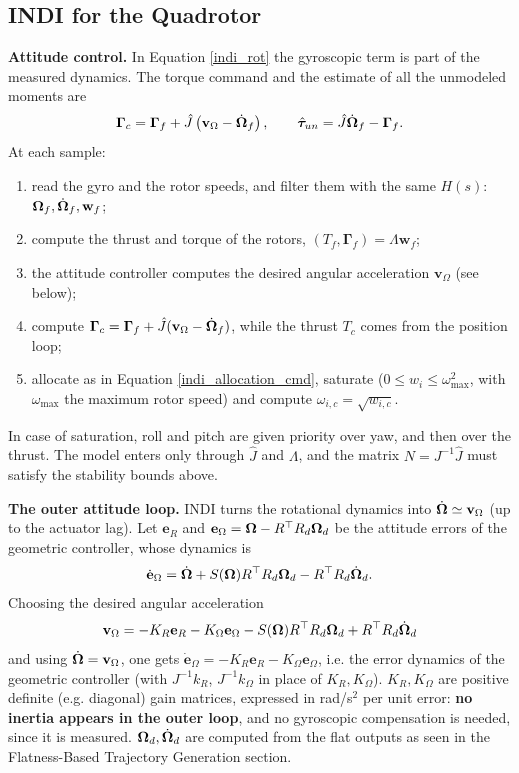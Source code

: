 \documentclass[10pt, a4paper]{report}
\begin{document}
\subsection{INDI for the Quadrotor}
\noindent\textbf{Attitude control.} In Equation \eqref{indi_rot} the gyroscopic term is part of the measured dynamics. The torque command and the estimate of all the unmodeled moments are\begin{equation}
    \boldsymbol{\Gamma}_c=\boldsymbol{\Gamma}_f+\hat J\left(\mathbf v_\Omega-\dot{{\boldsymbol{\Omega}}}_f\right),\qquad\hat{{\boldsymbol{\tau}}}_{un}=\hat J\dot{{\boldsymbol{\Omega}}}_f-\boldsymbol{\Gamma}_f.
\end{equation}
At each sample:\begin{enumerate}
    \item read the gyro and the rotor speeds, and filter them with the same $H(s)$: ${\boldsymbol{\Omega}}_f,\dot{{\boldsymbol{\Omega}}}_f,\mathbf w_f$;
    \item compute the thrust and torque of the rotors, $(T_f,\boldsymbol{\Gamma}_f)=\Lambda\mathbf w_f$;
    \item the attitude controller computes the desired angular acceleration $\mathbf v_\Omega$ (see below);
    \item compute $\boldsymbol{\Gamma}_c=\boldsymbol{\Gamma}_f+\hat J(\mathbf v_\Omega-\dot{{\boldsymbol{\Omega}}}_f)$, while the thrust $T_c$ comes from the position loop;
    \item allocate as in Equation \eqref{indi_allocation_cmd}, saturate ($0\le w_i\le\omega_{\max}^2$, with $\omega_{\max}$ the maximum rotor speed) and compute $\omega_{i,c}=\sqrt{w_{i,c}}$.
\end{enumerate}
In case of saturation, roll and pitch are given priority over yaw, and then over the thrust. The model enters only through $\hat J$ and $\Lambda$, and the matrix $N=J^{-1}\hat J$ must satisfy the stability bounds above.\bigskip

\noindent\textbf{The outer attitude loop.} INDI turns the rotational dynamics into $\dot{{\boldsymbol{\Omega}}}\simeq\mathbf v_\Omega$ (up to the actuator lag). Let $\mathbf e_R$ and $\mathbf e_\Omega={\boldsymbol{\Omega}}-R^\top R_d{\boldsymbol{\Omega}}_d$ be the attitude errors of the geometric controller, whose dynamics is
\begin{equation}
    \dot{\mathbf e}_\Omega=\dot{{\boldsymbol{\Omega}}}+S({\boldsymbol{\Omega}})R^\top R_d{\boldsymbol{\Omega}}_d-R^\top R_d\dot{{\boldsymbol{\Omega}}}_d.
\end{equation}
Choosing the desired angular acceleration
\begin{equation}
    \mathbf v_\Omega=-K_R\mathbf e_R-K_\Omega\mathbf e_\Omega-S({\boldsymbol{\Omega}})R^\top R_d{\boldsymbol{\Omega}}_d+R^\top R_d\dot{{\boldsymbol{\Omega}}}_d
\end{equation}
and using $\dot{{\boldsymbol{\Omega}}}=\mathbf v_\Omega$, one gets $\dot{\mathbf e}_\Omega=-K_R\mathbf e_R-K_\Omega\mathbf e_\Omega$, i.e. the error dynamics of the geometric controller (with $J^{-1}k_R$, $J^{-1}k_\Omega$ in place of $K_R,K_\Omega$). $K_R,K_\Omega$ are positive definite (e.g. diagonal) gain matrices, expressed in rad/s$^2$ per unit error: \textbf{no inertia appears in the outer loop}, and no gyroscopic compensation is needed, since it is measured. ${\boldsymbol{\Omega}}_d,\dot{{\boldsymbol{\Omega}}}_d$ are computed from the flat outputs as seen in the Flatness-Based Trajectory Generation section.\bigskip
\end{document}
